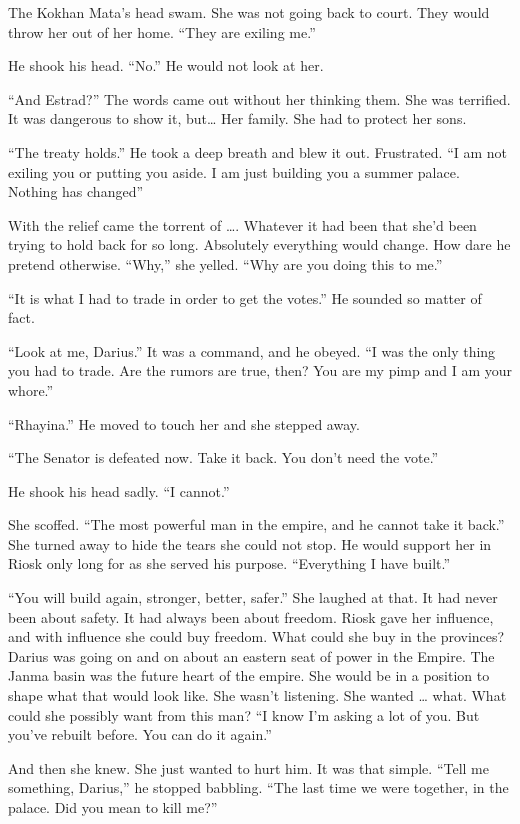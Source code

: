 \documentclass{article}
\begin{document}
	The Kokhan Mata’s head swam. She was not going back to court. They would throw her out of her home. “They are exiling me.”
	
	He shook his head. “No.” He would not look at her.
	
	“And Estrad?” The words came out without her thinking them. She was terrified. It was dangerous to show it, but… Her family. She had to protect her sons.
	
	“The treaty holds.” He took a deep breath and blew it out. Frustrated. “I am not exiling you or putting you aside. I am just building you a summer palace. Nothing has changed” 
	
	With the relief came the torrent of …. Whatever it had been that she’d been trying to hold back for so long. Absolutely everything would change. How dare he pretend otherwise. “Why,” she yelled. “Why are you doing this to me.” 
	
	“It is what I had to trade in order to get the votes.” He sounded so matter of fact.
	
	“Look at me, Darius.” It was a command, and he obeyed. “I was the only thing you had to trade. Are the rumors are true, then? You are my pimp and I am your whore.” 
	
	“Rhayina.” He moved to touch her and she stepped away. 
	
	“The Senator is defeated now. Take it back. You don’t need the vote.” 
	
	He shook his head sadly. “I cannot.” 
	
	She scoffed. “The most powerful man in the empire, and he cannot take it back.” She turned away to hide the tears she could not stop. He would support her in Riosk only long for as she served his purpose. “Everything I have built.”
	
	“You will build again, stronger, better, safer.” She laughed at that. It had never been about safety. It had always been about freedom. Riosk gave her influence, and with influence she could buy freedom. What could she buy in the provinces? Darius was going on and on about an eastern seat of power in the Empire. The Janma basin was the future heart of the empire. She would be in a position to shape what that would look like. She wasn’t listening. She wanted … what. What could she possibly want from this man? “I know I’m asking a lot of you. But you’ve rebuilt before. You can do it again.” 
	
	And then she knew. She just wanted to hurt him. It was that simple. “Tell me something, Darius,” he stopped babbling. “The last time we were together, in the palace. Did you mean to kill me?”
	
\end{document}
